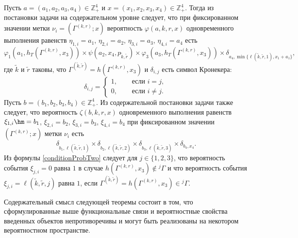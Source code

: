 Пусть $a=(a_1,  a_2,  a_3,  a_4) \in \mathbb{Z}_+^4$ и $x=(x_1,  x_2,  x_3,  x_4) \in \mathbb{Z}_+^4$. Тогда из постановки задачи на содержательном уровне следует,  что при фиксированном значении метки $\nu_i=(\Gamma^{(k,  r)}; x)$ вероятность $\varphi(a,  k,  r,  x)$ одновременного выполнения равенств $\eta_{1,  i}=a_1$,  $\eta_{2,  i}=a_2$,  $\eta_{3,  i}=a_3$,  $\eta_{4,  i}=a_4$ есть 
\begin{equation}
\varphi_1(a_1,  h_T(\Gamma^{(k,  r)},  x_3)) \times \psi(a_2,  x_4,  p_{\tilde{k},  \tilde{r}}) \times \varphi_3(a_3,  h_T(\Gamma^{(k,  r)},  x_3))
\times \delta_{a_4,  \min{\{\ell(\tilde{k},  \tilde{r},  1),  x_1+a_1}\}}, 
\label{conditionProbOne}
\end{equation}
где $\tilde{k}$ и $\tilde{r}$ таковы,  что $\Gamma^{(\tilde{k},  \tilde{r})}=h(\Gamma^{(k,  r)},  x_3)$ и $\delta_{i,  j}$ есть символ Кронекера:
$$
\delta_{i,  j}=
\begin{cases} 
1, & \quad \text{ если $i=j$, }\\
0, & \quad \text{ если $i\neq j$.}
\end{cases}
$$%
Пусть $b=(b_1,  b_2,  b_3,  b_4) \in \mathbb{Z}_+^4$. Из содержательной постановки задачи также следует,  что вероятность $\zeta(b,  k,  r,  x)$ одновременного выполнения равенств $\xi_{1,  i}\hm=b_1$,  $\xi_{2,  i}=b_2$,  $\xi_{3,  i}=b_3$,  $\xi_{4,  i}=b_4$ при фиксированном значении $(\Gamma^{(k,  r)}; x)$ метки $\nu_i$ есть
\begin{equation}
\delta_{b_1,  \ell(\tilde{k},  \tilde{r},  1)} \times \delta_{b_2,  \ell(\tilde{k},  \tilde{r},  2)} \times 
\delta_{b_3,  \ell(\tilde{k},  \tilde{r},  3)} \times \delta_{b_4,  x_4}.
\label{conditionProbTwo}
\end{equation}
Из формулы \eqref{conditionProbTwo} следует для $j\in \{1,  2,  3\}$,  что вероятность события $\xi_{j,  i}=0$ равна $1$ в случае $h(\Gamma^{(k,  r)},  x_3)\notin {}^j\Gamma$ и что вероятность события $\xi_{j, i}=\ell(\tilde{k},  \tilde{r},  j)$ равна $1$,  если $\Gamma^{(\tilde{k},  \tilde{r})}=h(\Gamma^{(k,  r)},  x_3)\in {}^j\Gamma$.


Содержательный смысл следующей теоремы состоит в том,  что сформулированные выше функциональные связи и вероятностные свойства введенных объектов непротиворечивы и могут быть реализованы на некотором вероятностном пространстве.

